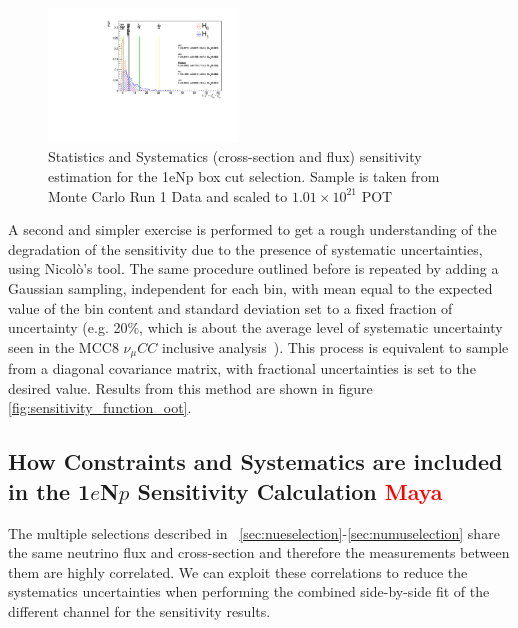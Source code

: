 \documentclass[a4paper]{article}
\newcommand{\numucc}{$\nu_{\mu} CC$ }
\begin{document}
\begin{figure}[H]
\begin{center}
\includegraphics[width=0.45\textwidth]{Sensitivity/SBNfit_Cls_nue_reco_e_genietune_run1_LEE_syst.pdf}
\caption{\label{fig:1eNp:box:statsystsensitivity} Statistics and Systematics (cross-section and flux) sensitivity estimation for the 1eNp box cut selection. Sample is taken from Monte Carlo Run 1 Data and scaled to $1.01\times10^21$ POT}
\end{center}
\end{figure}

A second and simpler exercise is performed to get a rough understanding of the degradation of the sensitivity due to the presence of systematic uncertainties, using Nicol\`o's tool.
The same procedure outlined before is repeated by adding a Gaussian sampling, independent for each bin, with mean equal to the expected value of the bin content and standard deviation set to a fixed fraction of uncertainty (e.g. 20\%, which is about the average level of systematic uncertainty seen in the MCC8 \numucc inclusive analysis~\cite{bib:numuCCincl}).
This process is equivalent to sample from a diagonal covariance matrix, with fractional uncertainties is set to the desired value.
Results from this method are shown in figure \ref{fig:sensitivity_function_oot}.

\subsection{How Constraints and Systematics are included in the 1$e$N$p$ Sensitivity Calculation \textcolor{red}{Maya}}

The multiple selections described in  ~\ref{sec:nueselection}-\ref{sec:numuselection} share the same neutrino flux and cross-section and therefore the measurements between them are highly correlated. We can exploit these correlations to reduce the systematics uncertainties when performing the combined side-by-side fit of the different channel for the sensitivity results.
\end{document}
